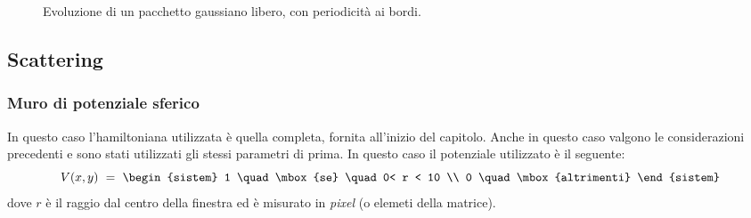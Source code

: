 \begin{figure}[!h]
 \centering
\caption{\small{Evoluzione di un pacchetto gaussiano libero, con periodicità ai bordi.}}
 \end{figure}
 
\subsection{Scattering}
  \subsubsection{Muro di potenziale sferico}
In questo caso l'hamiltoniana utilizzata è quella completa, fornita all'inizio del capitolo. Anche in questo caso valgono le considerazioni precedenti e sono stati utilizzati gli stessi parametri di prima.
In questo caso il potenziale utilizzato è il seguente:
$$
V(x,y) \ = \ \begin{sistem}
              1 \quad \mbox{se} \quad  0< r < 10 \\
              0 \quad \mbox{altrimenti}
             \end{sistem}
$$
dove $r$ è il raggio dal centro della finestra ed è misurato in \emph{pixel} (o elemeti della matrice).

